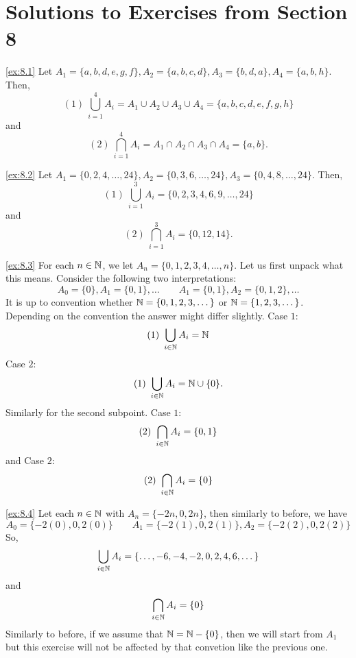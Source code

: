 
\section*{Solutions to Exercises from Section 8}

\begin{solution}\label{sol:8.1}\ref{ex:8.1}
    Let $A_{1}=\{ a,b,d,e,g,f \},A_{2}=\{ a,b,c,d \},A_{3}=\{ b,d,a \},A_{4}=\{ a,b,h \}$. Then,
    $$
    (1)~ \bigcup^{4}_{i=1}A_{i}= A_{1}\cup A_{2} \cup A_{3} \cup A_{4}=\{ a,b,c,d,e,f,g,h \}
    $$
    and 
    $$
    (2)~ \bigcap^{4}_{i=1}A_{i}=A_1 \cap A_2 \cap A_3 \cap A_4 =\{ a,b \}.
    $$
\end{solution}


\begin{solution}\label{sol:8.2}\ref{ex:8.2}
    Let $A_1= \{ 0,2,4,\dots,24 \},A_2=\{ 0,3,6,\dots,24 \},A_3=\{ 0,4,8,\dots,24 \}$. Then, 
    $$
    (1)~ \bigcup^{3}_{i=1}A_i=\{ 0,2,3,4,6,9,\dots,24 \}
    $$
    and 
    $$
    (2)~\bigcap^{3}_{i=1}A_i=\{ 0,12,14 \}.
    $$
\end{solution}


\begin{solution}\label{sol:8.3}\ref{ex:8.3}
    For each $n\in\mathbb{N}$, we let $A_n=\{ 0,1,2,3,4,\dots,n \}$. Let us first unpack what this means. Consider the following two interpretations: 
    $$
    A_0=\{ 0 \}, A_{1}=\{ 0,1 \},\dots \quad\quad A_1=\{ 0,1 \},A_2=\{ 0,1,2 \},\dots
    $$
    It is up to convention whether $\mathbb{N}=\{ 0,1,2,3,\dots \}$ or $\mathbb{N}=\{ 1,2,3,\dots \}$. Depending on the convention the answer might differ slightly. 
    Case $1$: 
    $$
    (1)~ \bigcup_{i\in\mathbb{N}}A_i= \mathbb{N}
    $$
    Case $2$: 
    $$
    (1)~ \bigcup_{i\in\mathbb{N}}A_i= \mathbb{N}\cup \{ 0 \}.
    $$
    Similarly for the second subpoint. 
    Case $1$: 
    $$
    (2)~ \bigcap_{i\in\mathbb{N}}A_i=\{ 0,1 \}
    $$
    and Case $2$:
    $$
    (2)~ \bigcap_{i\in\mathbb{N}}A_i=\{ 0 \}
    $$
\end{solution}

\begin{solution}\label{sol:8.4}\ref{ex:8.4}
    Let each $n\in \mathbb{N}$ with $A_{n} = \{ -2n, 0, 2n \}$, then similarly to before, we have 
    $$
    A_0 = \{ -2(0), 0, 2(0) \} \quad\quad A_1=\{ -2(1), 0, 2(1) \}, A_2=\{ -2(2), 0, 2(2) \}
    $$
    So, 
    $$
    \bigcup_{i\in\mathbb{N}}A_{i} = \{ \dots,-6,-4,-2,0,2,4,6,\dots \}
    $$
    and 
    $$
    \bigcap_{i\in\mathbb{N}}A_{i} = \{ 0 \}
    $$
    Similarly to before, if we assume that $\mathbb{N}=\mathbb{N} - \{ 0 \}$, then we will start from $A_1$ but this exercise will not be affected by that convetion like the previous one.
\end{solution}


